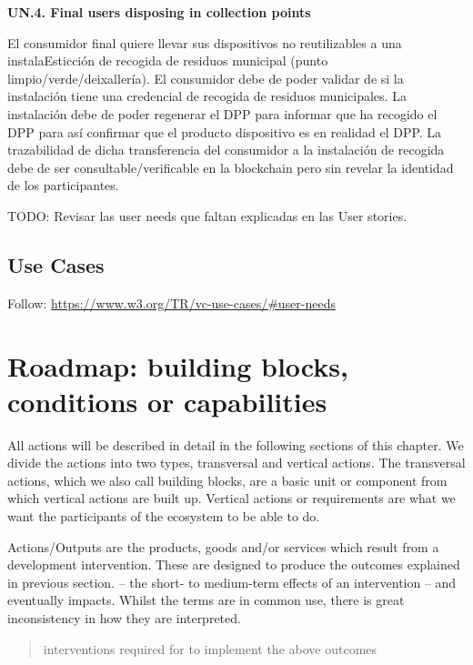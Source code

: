 \documentclass[
]{book}
\begin{document}
\textbf{UN.4. Final users disposing in collection points}

El consumidor final quiere llevar sus dispositivos no reutilizables a una instalaEsticción de recogida de residuos municipal (punto limpio/verde/deixallería). El consumidor debe de poder validar de si la instalación tiene una credencial de recogida de residuos municipales. La instalación debe de poder regenerar el DPP para informar que ha recogido el DPP para así confirmar que el producto dispositivo es en realidad el DPP. La trazabilidad de dicha transferencia del consumidor a la instalación de recogida debe de ser consultable/verificable en la blockchain pero sin revelar la identidad de los participantes.

TODO: Revisar las user needs que faltan explicadas en las User stories.

\hypertarget{use-cases}{%
\section{Use Cases}\label{use-cases}}

Follow: \url{https://www.w3.org/TR/vc-use-cases/\#user-needs}

\hypertarget{roadmap-building-blocks-conditions-or-capabilities}{%
\chapter{Roadmap: building blocks, conditions or capabilities}\label{roadmap-building-blocks-conditions-or-capabilities}}

All actions will be described in detail in the following sections of this chapter. We divide the actions into two types, transversal and vertical actions. The transversal actions, which we also call building blocks, are a basic unit or component from which vertical actions are built up. Vertical actions or requirements are what we want the participants of the ecosystem to be able to do.

Actions/Outputs are the products, goods and/or services which result from a development intervention. These are designed to produce the outcomes explained in previous section. -- the short- to medium-term effects of an intervention -- and eventually impacts. Whilst the terms are in common use, there is great inconsistency in how they are interpreted.

\begin{quote}
interventions required for to implement the above outcomes
\end{quote}
\end{document}
